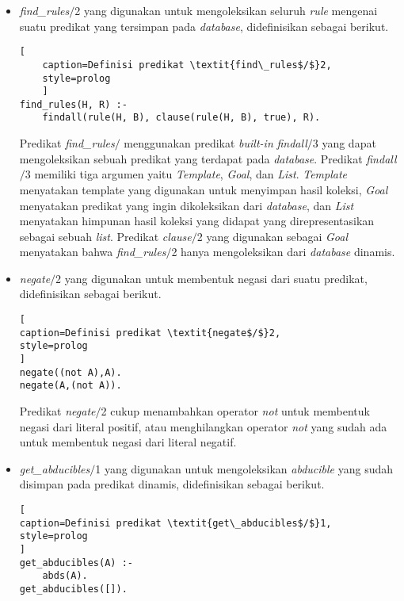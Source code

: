 \begin{itemize}
	\item \textit{find\_rules$/$}2 yang digunakan untuk mengoleksikan seluruh \textit{rule} mengenai suatu predikat yang tersimpan pada \textit{database}, didefinisikan sebagai berikut.
	\\
	\begin{lstlisting}[
	caption=Definisi predikat \textit{find\_rules$/$}2,
	style=prolog
	]
find_rules(H, R) :-
	findall(rule(H, B), clause(rule(H, B), true), R).
	\end{lstlisting}
	
	Predikat \textit{find\_rules$/$} menggunakan predikat \textit{built-in} \textit{findall$/$}3 yang dapat mengoleksikan sebuah predikat yang terdapat pada \textit{database}. Predikat \textit{findall$/$}3 memiliki tiga argumen yaitu \textit{Template}, \textit{Goal}, dan \textit{List}. \textit{Template} menyatakan template yang digunakan untuk menyimpan hasil koleksi, \textit{Goal} menyatakan predikat yang ingin dikoleksikan dari \textit{database}, dan \textit{List} menyatakan himpunan hasil koleksi yang didapat yang direpresentasikan sebagai sebuah \textit{list}. Predikat \textit{clause$/$}2 yang digunakan sebagai \textit{Goal} menyatakan bahwa \textit{find\_rules$/$}2 hanya mengoleksikan dari \textit{database} dinamis.
	
	\item \textit{negate$/$}2 yang digunakan untuk membentuk negasi dari suatu predikat, didefinisikan sebagai berikut.
	\\
	
\begin{lstlisting}[
caption=Definisi predikat \textit{negate$/$}2,
style=prolog
]
negate((not A),A).
negate(A,(not A)).
\end{lstlisting}
	
	Predikat \textit{negate$/$}2 cukup menambahkan operator \textit{not} untuk membentuk negasi dari literal positif, atau menghilangkan operator \textit{not} yang sudah ada untuk membentuk negasi dari literal negatif.
	
	\item \textit{get\_abducibles$/$}1 yang digunakan untuk mengoleksikan \textit{abducible} yang sudah disimpan pada predikat dinamis, didefinisikan sebagai berikut.
	\\
\begin{lstlisting}[
caption=Definisi predikat \textit{get\_abducibles$/$}1,
style=prolog
]
get_abducibles(A) :-
	abds(A).
get_abducibles([]).
\end{lstlisting}	
	

\end{itemize}
